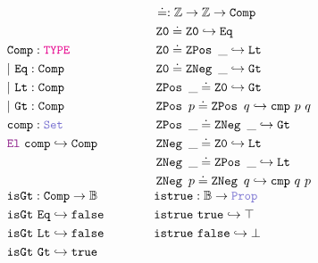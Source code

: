\begin{figure}
\begin{framed}
{\footnotesize
\centering
\[
\begin{array}[t]{l@{\hspace{4em}}l}
\begin{aligned}
&\tt{Comp}: \type{} \\
&|~\tt{Eq}: \tt{Comp} \\
&|~\tt{Lt}: \tt{Comp} \\
&|~\tt{Gt}: \tt{Comp} \\
&\tt{comp}: \set \\
&\el{}~\tt{comp} \re \tt{Comp}
\end{aligned}
&
\begin{aligned}
&\doteq : \Z \ra \Z \ra \tt{Comp} \\
& \ZO \doteq \ZO \re \tt{Eq} \\
& \ZO \doteq \ZPos~\_ \re \tt{Lt} \\
& \ZO \doteq \ZNeg~\_ \re \tt{Gt} \\
& \ZPos~\_ \doteq \ZO \re \tt{Gt} \\
& \ZPos~p \doteq \ZPos~q \re \tt{cmp}~p~q \\
& \ZPos~\_ \doteq \ZNeg~\_ \re \tt{Gt} \\
& \ZNeg~\_ \doteq \ZO \re \tt{Lt} \\
& \ZNeg~\_ \doteq \ZPos~\_ \re \tt{Lt} \\
& \ZNeg~p \doteq \ZNeg~q \re \tt{cmp}~q~p
\end{aligned}
\\[3em]
\begin{aligned}
  &\tt{isGt} : \tt{Comp} \ra \B \\
  &\tt{isGt}~\tt{Eq} \re \tt{false} \\
  &\tt{isGt}~\tt{Lt} \re \tt{false} \\
  &\tt{isGt}~\tt{Gt} \re \tt{true}
\end{aligned}
&
\begin{aligned}
  &\tt{istrue} : \B \ra \prop \\
  &\tt{istrue}~\tt{true} \re \top \\
  &\tt{istrue}~\tt{false} \re \bot\\
  &\\
\end{aligned}
\end{array}
\]

\vspace{3em}

}
\end{framed}
\end{figure}
